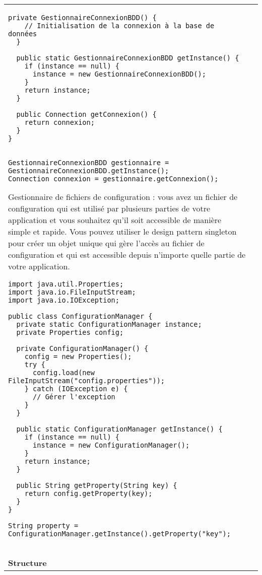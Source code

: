 \begin{table}[H]
\begin{adjustbox}{max width=\textwidth}
\begin{tabular}{l|p{\textwidth}}
\begin{minipage}[tl]{0.5\textwidth}
\begin{minipage}[b]{1\textwidth}
\begin{lstlisting}[style=monstyle]
  private GestionnaireConnexionBDD() {
    // Initialisation de la connexion à la base de données
  }

  public static GestionnaireConnexionBDD getInstance() {
    if (instance == null) {
      instance = new GestionnaireConnexionBDD();
    }
    return instance;
  }

  public Connection getConnexion() {
    return connexion;
  }
}


GestionnaireConnexionBDD gestionnaire = GestionnaireConnexionBDD.getInstance();
Connection connexion = gestionnaire.getConnexion();

\end{lstlisting} 
\end{minipage}
\end{minipage}
\hspace{6mm}
\begin{minipage}[tr]{0.5\textwidth}
\begin{minipage}[t]{1\textwidth}
Gestionnaire de fichiers de configuration : vous avez un fichier de configuration qui est utilisé par plusieurs parties de votre application et vous souhaitez qu'il soit accessible de manière simple et rapide. Vous pouvez utiliser le design pattern singleton pour créer un objet unique qui gère l'accès au fichier de configuration et qui est accessible depuis n'importe quelle partie de votre application.
\end{minipage}
\begin{minipage}[b]{1\textwidth}
\begin{lstlisting}[style=monstyle]
import java.util.Properties;
import java.io.FileInputStream;
import java.io.IOException;

public class ConfigurationManager {
  private static ConfigurationManager instance;
  private Properties config;

  private ConfigurationManager() {
    config = new Properties();
    try {
      config.load(new FileInputStream("config.properties"));
    } catch (IOException e) {
      // Gérer l'exception
    }
  }

  public static ConfigurationManager getInstance() {
    if (instance == null) {
      instance = new ConfigurationManager();
    }
    return instance;
  }

  public String getProperty(String key) {
    return config.getProperty(key);
  }
}

String property = ConfigurationManager.getInstance().getProperty("key");


\end{lstlisting}
\end{minipage}
\end{minipage}
\\
\cmidrule(lr){1-2}
\textbf{Structure} & 

\\
\bottomrule
\end{tabular}
\end{adjustbox}
\end{table}


